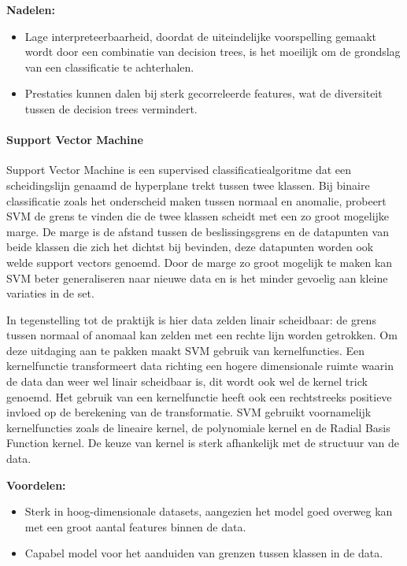 \textbf{Nadelen:}
\begin{itemize}
    \item Lage interpreteerbaarheid, doordat de uiteindelijke voorspelling
    gemaakt wordt door een combinatie van decision trees, is het moeilijk om
    de grondslag van een classificatie te achterhalen.
    \item Prestaties kunnen dalen bij sterk gecorreleerde features, wat de
    diversiteit tussen de decision trees vermindert.
\end{itemize}

\medskip

\paragraph{Support Vector Machine}

Support Vector Machine is een supervised classificatiealgoritme dat een scheidingslijn genaamd de hyperplane trekt tussen twee klassen. 
Bij binaire classificatie zoals het onderscheid maken tussen normaal en anomalie, probeert SVM de grens te vinden die de twee klassen scheidt met een zo groot mogelijke marge. 
De marge is de afstand tussen de beslissingsgrens en de datapunten van beide klassen die zich het dichtst bij bevinden, deze datapunten worden ook welde support vectors genoemd. 
Door de marge zo groot mogelijk te maken kan SVM beter generaliseren naar nieuwe data en is het minder gevoelig aan kleine variaties in de set\autocite{Cortes1995}.

In tegenstelling tot de praktijk is hier data zelden linair scheidbaar: de grens tussen normaal of anomaal kan zelden met een rechte lijn worden getrokken. 
Om deze uitdaging aan te pakken maakt SVM gebruik van kernelfuncties. Een kernelfunctie transformeert data richting een hogere dimensionale ruimte waarin de data dan weer wel linair scheidbaar is, dit wordt ook wel de kernel trick genoemd.
Het gebruik van een kernelfunctie heeft ook een rechtstreeks positieve invloed op de berekening van de transformatie. 
SVM gebruikt voornamelijk kernelfuncties zoals de lineaire kernel, de polynomiale kernel en de Radial Basis Function kernel. De keuze van kernel is sterk afhankelijk met de structuur van de data. %

\textbf{Voordelen:}
\begin{itemize}
    \item Sterk in hoog-dimensionale datasets, aangezien het model goed overweg
    kan met een groot aantal features binnen de data.
    \item Capabel model voor het aanduiden van grenzen tussen klassen in de data.
\end{itemize}

